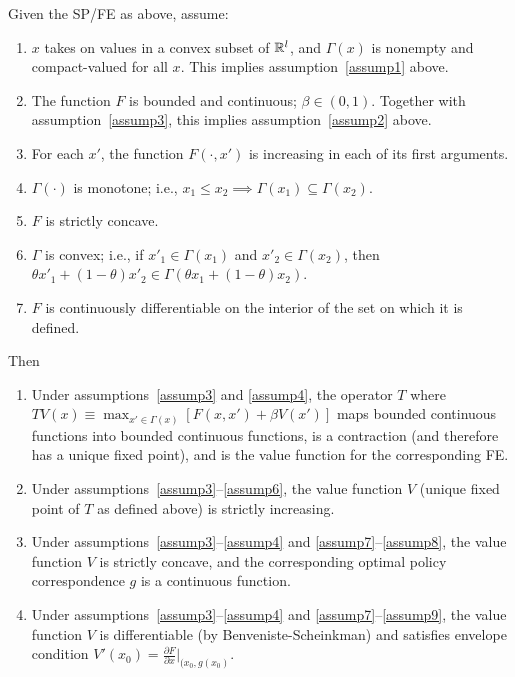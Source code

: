 \documentclass[8pt,letterpaper, landscape]{extarticle} %
\begin{document}
\begin{multicols}{3}
\begin{description}
 Given the SP/FE as above, assume:
\begin{enumerate}
\item \label{assump3} $ x $ takes on values in a convex subset of $ \mathbb{R}^l $, and $ \Gamma (x) $ is nonempty and compact-valued for all $ x $. This implies assumption~\ref{assump1} above.
\item \label{assump4} The function $ F $ is bounded and continuous; $ \beta \in (0,1) $. Together with assumption~\ref{assump3}, this implies assumption~\ref{assump2} above.
\item \label{assump5} For each $ x' $, the function $ F(\cdot , x') $ is increasing in each of its first arguments.
\item \label{assump6} $ \Gamma(\cdot) $ is monotone; i.e., $ x_1 \leq x_2 \implies \Gamma (x_1) \subseteq \Gamma (x_2) $.
\item \label{assump7} $ F $ is strictly concave.
\item \label{assump8} $ \Gamma $ is convex; i.e., if $ x'_1 \in \Gamma (x_1) $ and $ x'_2 \in \Gamma (x_2) $, then $ \theta x'_1 + (1-\theta) x'_2 \in \Gamma ( \theta x_1 + (1-\theta) x_2 ) $.
\item \label{assump9} $ F $ is continuously differentiable on the interior of the set on which it is defined.
\end{enumerate}
Then
\begin{enumerate}
\item Under assumptions~\ref{assump3} and \ref{assump4}, the operator $ T $ where $ TV(x) \equiv \max_{x' \in \Gamma (x)} [F(x,x') + \beta V(x')] $ maps bounded continuous functions into bounded continuous functions, is a contraction (and therefore has a unique fixed point), and is the value function for the corresponding FE.
\item Under assumptions~\ref{assump3}--\ref{assump6}, the value function $ V $ (unique fixed point of $ T $ as defined above) is strictly increasing.
\item Under assumptions~\ref{assump3}--\ref{assump4} and \ref{assump7}--\ref{assump8}, the value function $ V $ is strictly concave, and the corresponding optimal policy correspondence $ g $ is a continuous function.
\item Under assumptions~\ref{assump3}--\ref{assump4} and \ref{assump7}--\ref{assump9}, the value function $ V $ is differentiable (by Benveniste-Scheinkman) and satisfies envelope condition $ V'(x_0) = \frac{\partial F}{\partial x} |_{(x_0, g(x_0)} $.
\end{enumerate}


\end{description}
\end{multicols}
\end{document}
